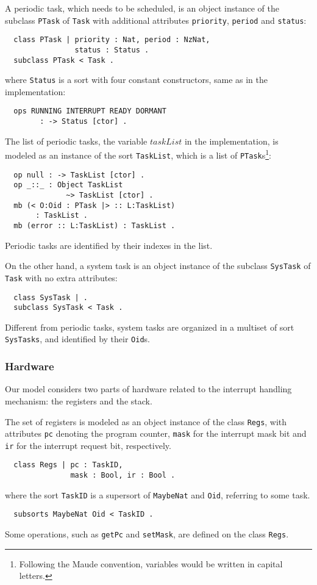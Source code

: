\documentclass[10pt,journal]{IEEEtran}
\begin{document}
A periodic task, which needs to be scheduled, is an object instance of
the subclass \verb|PTask| of \verb|Task| with additional attributes
\verb|priority|, \verb|period| and \verb|status|:
\begin{verbatim}
  class PTask | priority : Nat, period : NzNat, 
                status : Status .
  subclass PTask < Task .
\end{verbatim}
where \verb|Status| is a sort with four constant constructors, same as
in the implementation:
\begin{verbatim}
  ops RUNNING INTERRUPT READY DORMANT 
        : -> Status [ctor] .
\end{verbatim}
The list of periodic tasks, the variable $taskList$ in the
implementation, is modeled as an instance of the sort \verb|TaskList|,
which is a list of \verb|PTask|s\footnote{Following the Maude
  convention, variables would be written in capital letters.}:
\begin{verbatim}
  op null : -> TaskList [ctor] .
  op _::_ : Object TaskList 
              ~> TaskList [ctor] .
  mb (< O:Oid : PTask |> :: L:TaskList) 
       : TaskList .
  mb (error :: L:TaskList) : TaskList .
\end{verbatim}
Periodic tasks are identified by their indexes in the list.

On the other hand, a system task is an object instance of the subclass
\verb|SysTask| of \verb|Task| with no extra attributes:
\begin{verbatim}
  class SysTask | .            
  subclass SysTask < Task .
\end{verbatim}
Different from periodic tasks, system tasks are organized in a
multiset of sort \verb|SysTasks|, and identified by their \verb|Oid|s.

\subsubsection{Hardware}
Our model considers two parts of hardware related to the interrupt
handling mechanism: the registers and the stack.

The set of registers is modeled as an object instance of the class
\verb|Regs|, with attributes \verb|pc| denoting the program counter,
\verb|mask| for the interrupt mask bit and \verb|ir| for the interrupt
request bit, respectively.
\begin{verbatim}
  class Regs | pc : TaskID, 
               mask : Bool, ir : Bool .
\end{verbatim}
where the sort \verb|TaskID| is a supersort of \verb|MaybeNat| and
\verb|Oid|, referring to some task.
\begin{verbatim}
  subsorts MaybeNat Oid < TaskID .
\end{verbatim}
Some operations, such as \verb|getPc| and \verb|setMask|, are defined
on the class \verb|Regs|.
\end{document}
